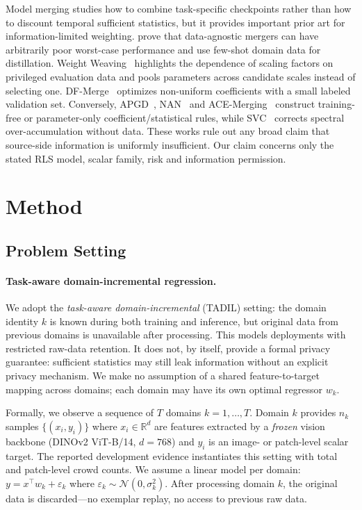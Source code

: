 \documentclass[10pt]{article}
\newcommand{\R}{\mathbb{R}}
\begin{document}
Model merging studies how to combine task-specific checkpoints rather than
how to discount temporal sufficient statistics, but it provides important
prior art for information-limited weighting.  \citet{xu2025prodistill}
prove that data-agnostic mergers can have
arbitrarily poor worst-case performance and use few-shot domain data for
distillation.  Weight Weaving~\citep{chaves2026weight} highlights the dependence
of scaling factors on privileged evaluation data and pools parameters across
candidate scales instead of selecting one.  DF-Merge~\citep{lee2025dfmerge}
optimizes non-uniform coefficients with a small labeled validation set.
Conversely, APGD~\citep{wei2025apgd}, NAN~\citep{si2025nan} and
ACE-Merging~\citep{xu2026ace} construct training-free or parameter-only
coefficient/statistical rules, while SVC~\citep{li2026svc} corrects spectral
over-accumulation without data.  These works rule out any broad claim that
source-side information is uniformly insufficient.  Our claim concerns only
the stated RLS model, scalar family, risk and information permission.

\section{Method}
\label{sec:method}

\subsection{Problem Setting}

\paragraph{Task-aware domain-incremental regression.}
We adopt the \emph{task-aware domain-incremental} (TADIL) setting: the
domain identity $k$ is known during both training and inference, but
original data from previous domains is unavailable after processing.
This models deployments with restricted raw-data retention.  It does not,
by itself, provide a formal privacy guarantee: sufficient statistics may
still leak information without an explicit privacy mechanism.
We make no assumption of a shared feature-to-target mapping across domains;
each domain may have its own optimal regressor $w_k$.

Formally, we observe a sequence of $T$ domains $k=1,\dots,T$.
Domain $k$ provides $n_k$ samples $\{(x_i, y_i)\}$ where
$x_i \in \R^d$ are features extracted by a \emph{frozen} vision
backbone (DINOv2 ViT-B/14, $d=768$) and $y_i$ is an image- or patch-level
scalar target.  The reported development evidence instantiates this setting
with total and patch-level crowd counts.
We assume a linear model per domain: $y = x^\top w_k + \varepsilon_k$
where $\varepsilon_k \sim \mathcal{N}(0, \sigma_k^2)$.
After processing domain $k$, the original data is discarded---no exemplar
replay, no access to previous raw data.
\end{document}
